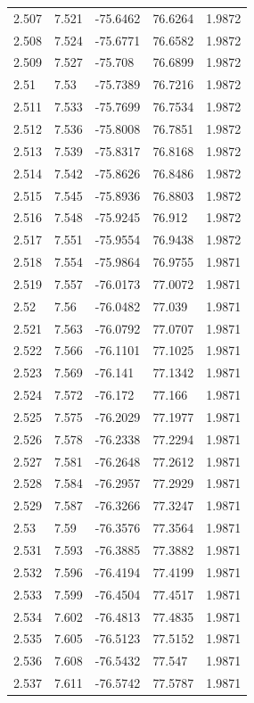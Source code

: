\begin{tabular}{lllll}
2.507 & 7.521 & -75.6462 & 76.6264 & 1.9872 \\
2.508 & 7.524 & -75.6771 & 76.6582 & 1.9872 \\
2.509 & 7.527 & -75.708 & 76.6899 & 1.9872 \\
2.51 & 7.53 & -75.7389 & 76.7216 & 1.9872 \\
2.511 & 7.533 & -75.7699 & 76.7534 & 1.9872 \\
2.512 & 7.536 & -75.8008 & 76.7851 & 1.9872 \\
2.513 & 7.539 & -75.8317 & 76.8168 & 1.9872 \\
2.514 & 7.542 & -75.8626 & 76.8486 & 1.9872 \\
2.515 & 7.545 & -75.8936 & 76.8803 & 1.9872 \\
2.516 & 7.548 & -75.9245 & 76.912 & 1.9872 \\
2.517 & 7.551 & -75.9554 & 76.9438 & 1.9872 \\
2.518 & 7.554 & -75.9864 & 76.9755 & 1.9871 \\
2.519 & 7.557 & -76.0173 & 77.0072 & 1.9871 \\
2.52 & 7.56 & -76.0482 & 77.039 & 1.9871 \\
2.521 & 7.563 & -76.0792 & 77.0707 & 1.9871 \\
2.522 & 7.566 & -76.1101 & 77.1025 & 1.9871 \\
2.523 & 7.569 & -76.141 & 77.1342 & 1.9871 \\
2.524 & 7.572 & -76.172 & 77.166 & 1.9871 \\
2.525 & 7.575 & -76.2029 & 77.1977 & 1.9871 \\
2.526 & 7.578 & -76.2338 & 77.2294 & 1.9871 \\
2.527 & 7.581 & -76.2648 & 77.2612 & 1.9871 \\
2.528 & 7.584 & -76.2957 & 77.2929 & 1.9871 \\
2.529 & 7.587 & -76.3266 & 77.3247 & 1.9871 \\
2.53 & 7.59 & -76.3576 & 77.3564 & 1.9871 \\
2.531 & 7.593 & -76.3885 & 77.3882 & 1.9871 \\
2.532 & 7.596 & -76.4194 & 77.4199 & 1.9871 \\
2.533 & 7.599 & -76.4504 & 77.4517 & 1.9871 \\
2.534 & 7.602 & -76.4813 & 77.4835 & 1.9871 \\
2.535 & 7.605 & -76.5123 & 77.5152 & 1.9871 \\
2.536 & 7.608 & -76.5432 & 77.547 & 1.9871 \\
2.537 & 7.611 & -76.5742 & 77.5787 & 1.9871 \\

\end{tabular}
